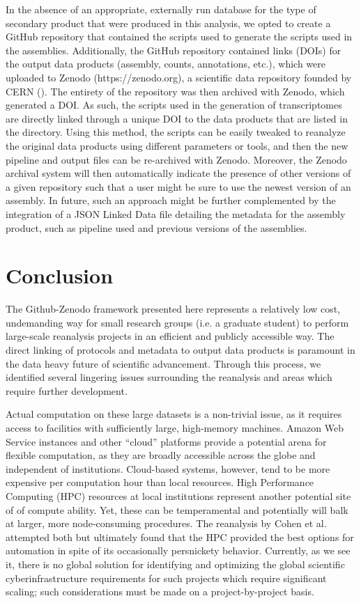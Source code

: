 \documentclass[12pt]{article}
\begin{document}
In the absence of an appropriate, externally run database for the type of secondary product that were produced in this analysis, we opted to create a GitHub repository that contained the scripts used to generate the scripts used in the assemblies. Additionally, the GitHub repository contained links (DOIs) for the output data products (assembly, counts, annotations, etc.), which were uploaded to Zenodo (https://zenodo.org), a scientific data repository founded by CERN (). The entirety of the repository was then archived with Zenodo, which generated a DOI. As such, the scripts used in the generation of transcriptomes are directly linked through a unique DOI to the data products that are listed in the directory. Using this method, the scripts can be easily tweaked to reanalyze the original data products using different parameters or tools, and then the new pipeline and output files can be re-archived with Zenodo. Moreover, the Zenodo archival system will then automatically indicate the presence of other versions of a given repository such that a user might be sure to use the newest version of an assembly. In future, such an approach might be further complemented by the integration of a JSON Linked Data file detailing the metadata for the assembly product, such as pipeline used and previous versions of the assemblies.

\section{Conclusion}

The Github-Zenodo framework presented here represents a relatively low cost, undemanding way for small research groups (i.e. a graduate student) to perform large-scale reanalysis projects in an efficient and publicly accessible way. The direct linking of protocols and metadata to output data products is paramount in the data heavy future of scientific advancement. Through this process, we identified several lingering issues surrounding the reanalysis and areas which require further development.

Actual computation on these large datasets is a non-trivial issue, as it requires access to facilities with sufficiently large, high-memory machines. Amazon Web Service instances and other ``cloud'' platforms provide a potential arena for flexible computation, as they are broadly accessible across the globe and independent of institutions. Cloud-based systems, however, tend to be more expensive per computation hour than local resources. High Performance Computing (HPC) resources at local institutions represent another potential site of of compute ability. Yet, these can be temperamental and potentially will balk at larger, more node-consuming procedures. The reanalysis by Cohen et al. \cite{Cohen2017} attempted both but ultimately found that the HPC provided the best options for automation in spite of its occasionally persnickety behavior. Currently, as we see it, there is no global solution for identifying and optimizing the global scientific cyberinfrastructure requirements for such projects which require significant scaling; such considerations must be made on a project-by-project basis.
\end{document}
